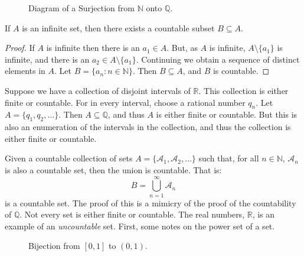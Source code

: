        \begin{figure}[H]
            \centering
            \captionsetup{type=figure}
            \resizebox{\textwidth}{!}{%
                
            }
            \caption{Diagram of a Surjection from
                     $\mathbb{N}$ onto $\mathbb{Q}$.}
            \label{fig:Bijection_N_and_Q}
        \end{figure}
        \begin{theorem}
            If $A$ is an infinite set, then there exists a
            countable subset $B\subseteq{A}$.
        \end{theorem}
        \begin{proof}
            If $A$ is infinite then there is an
            $a_{1}\in{A}$. But, as $A$ is infinite,
            $A\setminus\{a_{1}\}$ is infinite, and there
            is an $a_{2}\in{A}\setminus\{a_{1}\}$. Continuing
            we obtain a sequence of distinct elements in $A$.
            Let $B=\{a_{n}:n\in\mathbb{N}\}$. Then
            $B\subseteq{A}$, and $B$ is countable.
        \end{proof}
        \begin{lexample}
            Suppose we have a collection of disjoint intervals
            of $\mathbb{R}$. This collection is either finite
            or countable. For in every interval, choose a
            rational number $q_{n}$. Let
            $A=\{q_{1},q_{2},\hdots\}$. Then
            $A\subseteq\mathbb{Q}$, and thus $A$ is either
            finite or countable. But this is also an enumeration
            of the intervals in the collection, and thus the
            collection is either finite or countable.
        \end{lexample}
        Given a countable collection of sets
        $A=\{\mathcal{A}_{1},\mathcal{A}_{2},\hdots\}$ such
        that, for all $n\in\mathbb{N}$, $\mathcal{A}_{n}$ is
        also a countable set, then the union is countable. That is:
        \begin{equation}
            B=\bigcup_{n=1}^{\infty}\mathcal{A}_{n}
        \end{equation}
        is a countable set. The proof of this is a mimicry of
        the proof of the countability of $\mathbb{Q}$. Not
        every set is either finite or countable. The real numbers,
        $\mathbb{R}$, is an example of an \textit{uncountable}
        set. First, some notes on the power set of a set.
        \begin{figure}[H]
            \centering
            \captionsetup{type=figure}
            
            \caption{Bijection from $[0,1]$ to $(0,1)$.}
            \label{fig:Measure_Theory_Bijection_Closed_I_to_Open}
        \end{figure}

